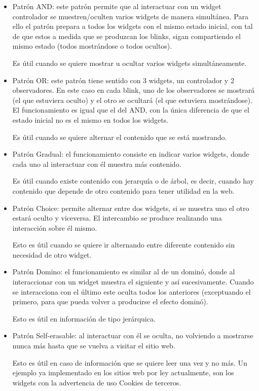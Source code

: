 \begin{itemize}
\item{Patrón AND: este patrón permite que al interactuar con un widget controlador se muestren/oculten varios widgets de manera simultánea. Para ello el patrón prepara a todos los widgets con el mismo estado inicial, con tal de que estos a medida que se produzcan los blinks, sigan compartiendo el mismo estado (todos mostrándose o todos ocultos).
 
Es útil cuando se quiere mostrar u ocultar varios widgets simultáneamente.}
\item{Patrón OR: este patrón tiene sentido con 3 widgets, un controlador y 2 observadores. En este caso en cada blink, uno de los observadores se mostrará (el que estuviera oculto) y el otro se ocultará (el que estuviera mostrándose). El funcionamiento es igual que el del AND, con la única diferencia de que el estado inicial no es el mismo en todos los widgets.

Es útil cuando se quiere alternar el contenido que se está mostrando.}
\item{Patrón Gradual: el funcionamiento consiste en indicar varios widgets, donde cada uno al interactuar con él muestra más contenido.

Es útil cuando existe contenido con jerarquía o de árbol, es decir, cuando hay contenido que depende de otro contenido para tener utilidad en la web.}
\item{Patrón Choice: permite alternar entre dos widgets, si se muestra uno el otro estará oculto y viceversa. El intercambio se produce realizando una interacción sobre él mismo.

Esto es útil cuando se quiere ir alternando entre diferente contenido sin necesidad de otro widget.}
\item{Patrón Domino: el funcionamiento es similar al de un dominó, donde al interaccionar con un widget muestra el siguiente y así sucesivamente. Cuando se interacciona con el último este oculta todos los anteriores (exceptuando el primero, para que pueda volver a producirse el efecto dominó).

Esto es útil en información de tipo jerárquica.}
\item{Patrón Self-erasable: al interactuar con él se oculta, no volviendo a mostrarse nunca más hasta que se vuelva a visitar el sitio web.

Esto es útil en caso de información que se quiere leer una vez y no más. Un ejemplo ya implementado en los sitios web por ley actualmente, son los widgets con la advertencia de uso Cookies de terceros.}
\end{itemize}


